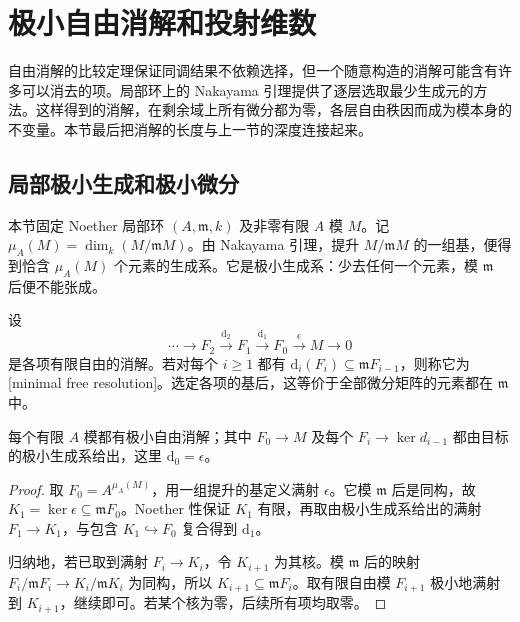 
% 
% 

\section{极小自由消解和投射维数}
\label{g5:sec:0804}

自由消解的比较定理保证同调结果不依赖选择，但一个随意构造的消解可能含有许多可以消去的项。局部环上的 Nakayama 引理提供了逐层选取最少生成元的方法。这样得到的消解，在剩余域上所有微分都为零，各层自由秩因而成为模本身的不变量。本节最后把消解的长度与上一节的深度连接起来。

\subsection{局部极小生成和极小微分}
\label{g5:subsec:0804:01}

本节固定 Noether 局部环 \((A,\mathfrak m,k)\) 及非零有限 \(A\) 模 \(M\)。记
\(\mu_A(M)=\dim_k(M/\mathfrak mM)\)。由 Nakayama 引理，提升 \(M/\mathfrak mM\) 的一组基，便得到恰含 \(\mu_A(M)\) 个元素的生成系。它是极小生成系：少去任何一个元素，模 \(\mathfrak m\) 后便不能张成。

\begin{definition}\label{g5:def:minimal-free-resolution}
	设
	\[
		\cdots\longrightarrow F_2\xrightarrow{\mathrm d_2}F_1
		\xrightarrow{\mathrm d_1}F_0\xrightarrow{\epsilon}M\longrightarrow0
	\]
	是各项有限自由的消解。若对每个 \(i\geq1\) 都有 \(\mathrm d_i(F_i)\subseteq\mathfrak mF_{i-1}\)，则称它为[minimal free resolution]。选定各项的基后，这等价于全部微分矩阵的元素都在 \(\mathfrak m\) 中。
\end{definition}

\begin{proposition}\label{g5:prop:minimal-resolution-existence}
	每个有限 \(A\) 模都有极小自由消解；其中 \(F_0\to M\) 及每个 \(F_i\to\ker d_{i-1}\) 都由目标的极小生成系给出，这里 \(\mathrm d_0=\epsilon\)。
\end{proposition}
\begin{proof}
	取 \(F_0=A^{\mu_A(M)}\)，用一组提升的基定义满射 \(\epsilon\)。它模 \(\mathfrak m\) 后是同构，故 \(K_1=\ker\epsilon\subseteq\mathfrak mF_0\)。Noether 性保证 \(K_1\) 有限，再取由极小生成系给出的满射 \(F_1\to K_1\)，与包含 \(K_1\hookrightarrow F_0\) 复合得到 \(\mathrm d_1\)。

	归纳地，若已取到满射 \(F_i\to K_i\)，令 \(K_{i+1}\) 为其核。模 \(\mathfrak m\) 后的映射 \(F_i/\mathfrak mF_i\to K_i/\mathfrak mK_i\) 为同构，所以 \(K_{i+1}\subseteq\mathfrak mF_i\)。取有限自由模 \(F_{i+1}\) 极小地满射到 \(K_{i+1}\)，继续即可。若某个核为零，后续所有项均取零。
\end{proof}


